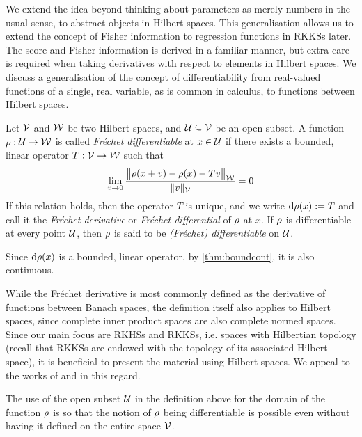 We extend the idea beyond thinking about parameters as merely numbers in the usual sense, to abstract objects in Hilbert spaces. 
This generalisation allows us to extend the concept of Fisher information to regression functions in RKKSs later.
The score and Fisher information is derived in a familiar manner, but extra care is required when taking derivatives with respect to elements in Hilbert spaces.  
We discuss a generalisation of the concept of differentiability from real-valued functions of a single, real variable, as is common in calculus, to functions between Hilbert spaces.

\begin{definition}\label{def:frechet}
  Let ${\mathcal V}$ and ${\mathcal W}$ be two Hilbert spaces, and ${\mathcal U} \subseteq {\mathcal V}$ be an open subset.
  A function $\rho :{\mathcal U}\to{\mathcal W}$ is called \emph{Fréchet differentiable} at $x \in {\mathcal U}$ if there exists a bounded, linear operator $T:{\mathcal V}\to{\mathcal W}$ such that 
  \[
    \lim_{v\to 0} \frac{\big\Vert \rho(x+v) - \rho(x) - T v \big\Vert_{{\mathcal W}}}{\lVert v\rVert_{\mathcal V}} = 0
  \]
  If this relation holds, then the operator $T$ is unique, and we write $\text{d} \rho(x) := T$ and call it the \emph{Fréchet derivative} or \emph{Fréchet differential} of $\rho$ at $x$.
  If $\rho$ is differentiable at every point ${\mathcal U}$, then $\rho$ is said to be \emph{(Fréchet) differentiable} on ${\mathcal U}$.
\end{definition}

\begin{remark}
  Since $\text{d} \rho(x)$ is a bounded, linear operator, by \cref{thm:boundcont}, it is also continuous. 
\end{remark}

\begin{remark}
  While the Fréchet derivative is most commonly defined as the derivative of functions between Banach spaces,  the definition itself also applies to Hilbert spaces, since complete inner product spaces are also complete normed spaces.
  Since our main focus are RKHSs and RKKSs, i.e. spaces with Hilbertian topology (recall that RKKSs are endowed with the topology of its associated Hilbert space), it is beneficial to present the material using Hilbert spaces.
  We appeal to the works of \citet[Definition 3.6.5]{balakrishnan1981applied} and \citet[Section 6]{bouboulis2011extension} in this regard.
\end{remark}

\begin{remark}
  The use of the open subset ${\mathcal U}$ in the definition above for the domain of the function $\rho$ is so that the notion of $\rho$ being differentiable is possible even without having it defined on the entire space ${\mathcal V}$.
\end{remark}

